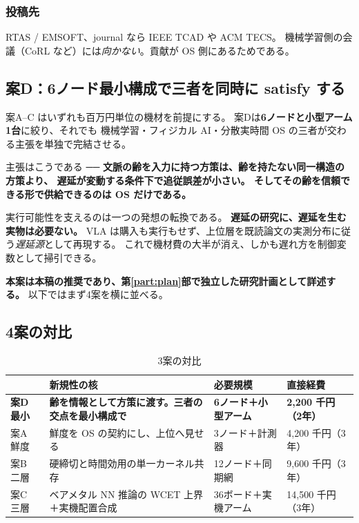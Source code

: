 \documentclass[11pt,a4paper]{article}
\newcommand{\keyp}[1]{\textbf{\textcolor{blue!45!black}{#1}}}
\begin{document}
\subsubsection*{投稿先}

RTAS / EMSOFT、journal なら IEEE TCAD や ACM TECS。
機械学習側の会議（CoRL など）には\emph{向かない}。貢献が OS 側にあるためである。

\subsection{案D：6ノード最小構成で三者を同時に satisfy する}
\label{sec:planD}

案A--C はいずれも百万円単位の機材を前提にする。
案Dは\keyp{6ノードと小型アーム1台}に絞り、それでも
機械学習・フィジカル AI・分散実時間 OS の三者が交わる主張を単独で完結させる。

主張はこうである ──
\keyp{文脈の齢を入力に持つ方策は、齢を持たない同一構造の方策より、
遅延が変動する条件下で追従誤差が小さい。
そしてその齢を信頼できる形で供給できるのは OS だけである。}

実行可能性を支えるのは一つの発想の転換である。
\keyp{遅延の研究に、遅延を生む実物は必要ない。}
VLA は購入も実行もせず、上位層を既読論文の実測分布に従う\emph{遅延源}として再現する。
これで機材費の大半が消え、しかも遅れ方を制御変数として掃引できる。

\keyp{本案は本稿の推奨であり、第\ref{part:plan}部で独立した研究計画として詳述する。}
以下ではまず4案を横に並べる。


\subsection{4案の対比}

\begin{table}[htbp]
\centering
\small
\caption{3案の対比}
\begin{tabularx}{\textwidth}{@{}l X l l@{}}
\toprule
 & \textbf{新規性の核} & \textbf{必要規模} & \textbf{直接経費} \\
\midrule
\textbf{案D 最小} & \textbf{齢を情報として方策に渡す。三者の交点を最小構成で} & \textbf{6ノード＋小型アーム} & \textbf{2,200 千円（2年）} \\
案A 鮮度 & 鮮度を OS の契約にし、上位へ見せる & 3ノード＋計測器 & 4,200 千円（3年） \\
案B 二層 & 硬締切と時間効用の単一カーネル共存 & 12ノード＋同期網 & 9,600 千円（3年） \\
案C 三層 & ベアメタル NN 推論の WCET 上界＋実機配置合成 & 36ボード＋実機アーム & 14,500 千円（3年） \\
\bottomrule
\end{tabularx}
\end{table}
\end{document}

